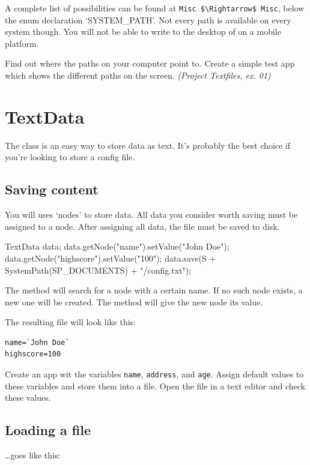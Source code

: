 A complete list of possibilities can be found at \verb|Misc $\Rightarrow$ Misc|, below the enum declaration `SYSTEM\_PATH'. Not every path is available on every system though. You will not be able to write to the desktop of on a mobile platform.

\begin{exercise}
Find out where the paths on your computer point to. Create a simple test app which shows the different paths on the screen. \textsl{(Project Textfiles, ex. 01)}
\end{exercise}

\section{TextData}

The  class is an easy way to store data as text. It's probably the best choice if you're looking to store a config file.

\subsection{Saving content}
You will uses `nodes' to store data. All data you consider worth saving must be assigned to a node. After assigning all data, the file must be saved to disk.

\begin{code}
TextData data;
data.getNode("name").setValue("John Doe");
data.getNode("highscore").setValue("100");
data.save(S + SystemPath(SP_DOCUMENTS) + "/config.txt");
\end{code} 

The method  will search for a node with a certain name. If no such node exists, a new one will be created. The method  will give the new node its value.

The resulting file will look like this:
\begin{verbatim}
name=`John Doe`
highscore=100
\end{verbatim}

\begin{exercise}
Create an app wit the variables \texttt{name}, \texttt{address}, and \texttt{age}. Assign default values to these variables and store them into a file. Open the file in a text editor and check these values.
\end{exercise}

\subsection{Loading a file}
\ldots goes like this:

